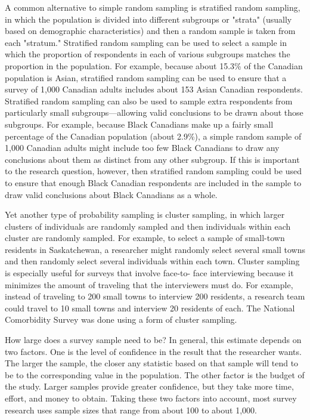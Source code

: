 A common alternative to simple random sampling is stratified random sampling, in which the population is divided into different subgroups or "strata" (usually based on demographic characteristics) and then a random sample is taken from each "stratum." Stratified random sampling can be used to select a sample in which the proportion of respondents in each of various subgroups matches the proportion in the population. For example, because about 15.3\% of the Canadian population is Asian, stratified random sampling can be used to ensure that a survey of 1,000 Canadian adults includes about 153 Asian Canadian respondents. Stratified random sampling can also be used to sample extra respondents from particularly small subgroups---allowing valid conclusions to be drawn about those subgroups. For example, because Black Canadians make up a fairly small percentage of the Canadian population (about 2.9\%), a simple random sample of 1,000 Canadian adults might include too few Black Canadians to draw any conclusions about them as distinct from any other subgroup. If this is important to the research question, however, then stratified random sampling could be used to ensure that enough Black Canadian respondents are included in the sample to draw valid conclusions about Black Canadians as a whole.

Yet another type of probability sampling is cluster sampling, in which larger clusters of individuals are randomly sampled and then individuals within each cluster are randomly sampled. For example, to select a sample of small-town residents in Saskatchewan, a researcher might randomly select several small towns and then randomly select several individuals within each town. Cluster sampling is especially useful for surveys that involve face-to- face interviewing because it minimizes the amount of traveling that the interviewers must do. For example, instead of traveling to 200 small towns to interview 200 residents, a research team could travel to 10 small towns and interview 20 residents of each. The National Comorbidity Survey was done using a form of cluster sampling.

How large does a survey sample need to be? In general, this estimate depends on two factors. One is the level of confidence in the result that the researcher wants. The larger the sample, the closer any statistic based on that sample will tend to be to the corresponding value in the population. The other factor is the budget of the study. Larger samples provide greater confidence, but they take more time, effort, and money to obtain. Taking these two factors into account, most survey research uses sample sizes that range from about 100 to about 1,000.

